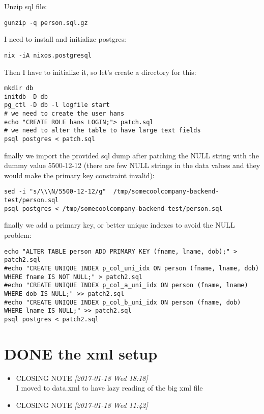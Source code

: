 \documentclass[11pt]{article}
\begin{document}
Unzip sql file:
\begin{verbatim}
gunzip -q person.sql.gz
\end{verbatim}

I need to install and initialize postgres:

\begin{verbatim}
nix -iA nixos.postgresql
\end{verbatim}

Then I have to initialize it, so let's create a directory for this:

\begin{verbatim}
mkdir db
initdb -D db
pg_ctl -D db -l logfile start
# we need to create the user hans
echo "CREATE ROLE hans LOGIN;"> patch.sql
# we need to alter the table to have large text fields
psql postgres < patch.sql
\end{verbatim}

finally we import the provided sql dump after patching the NULL string
with the dummy value 5500-12-12 (there are few NULL strings in the
data values and they would make the primary key constraint invalid):

\begin{verbatim}
sed -i "s/\\\N/5500-12-12/g"  /tmp/somecoolcompany-backend-test/person.sql
psql postgres < /tmp/somecoolcompany-backend-test/person.sql
\end{verbatim}


finally we add a primary key, or better unique indexes to avoid the NULL problem:

\begin{verbatim}
echo "ALTER TABLE person ADD PRIMARY KEY (fname, lname, dob);" > patch2.sql
#echo "CREATE UNIQUE INDEX p_col_uni_idx ON person (fname, lname, dob) WHERE fname IS NOT NULL;" > patch2.sql
#echo "CREATE UNIQUE INDEX p_col_a_uni_idx ON person (fname, lname) WHERE dob IS NULL;" >> patch2.sql
#echo "CREATE UNIQUE INDEX p_col_b_uni_idx ON person (fname, dob) WHERE lname IS NULL;" >> patch2.sql
psql postgres < patch2.sql
\end{verbatim}

\section{{\bfseries\sffamily DONE} the xml setup}
\label{sec:org222663c}
\begin{itemize}
\item CLOSING NOTE \textit{[2017-01-18 Wed 18:18] } \\
I moved to data.xml to have lazy reading of the big xml file
\item CLOSING NOTE \textit{[2017-01-18 Wed 11:42]}
\end{itemize}
\end{document}
